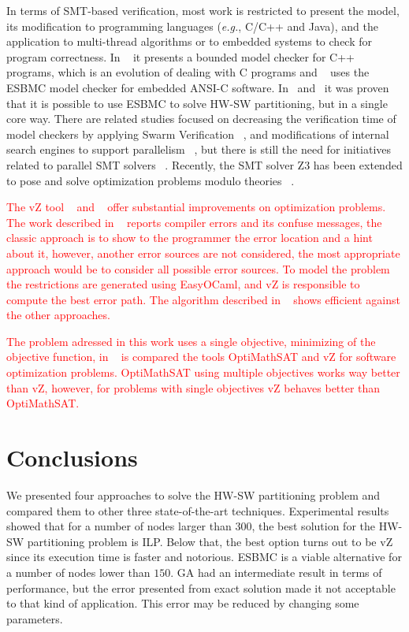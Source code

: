 In terms of SMT-based verification, most work is restricted to present the model, its modification to programming languages ({\it e.g.}, C/C++ and Java), and the application to multi-thread algorithms or to embedded systems to check for program correctness. In ~\cite{Ramalho2013} it presents a bounded model checker for C++ programs, which is an evolution of dealing with C programs and ~\cite{Cordeiro2012} uses the ESBMC model checker for embedded ANSI-C software. In~\cite{Trindade2015} and~\cite{Trindade2014} it was proven that it is possible to use ESBMC to solve HW-SW partitioning, but in a single core way. There are related studies focused on decreasing the verification time of model checkers by applying Swarm Verification ~\cite{Holzmann2011}, and modifications of internal search engines to support parallelism ~\cite{Holzmann2012}, but there is still the need for initiatives related to parallel SMT solvers ~\cite{Wintersteiger2009}. Recently, the SMT solver Z3 has been extended to pose and solve optimization problems modulo theories ~\cite{Bjorner2015}.

\textcolor{Red}{The vZ tool ~\cite{Bjorner2014} and ~\cite{Bjorner2015} offer substantial improvements on optimization problems. The work described in ~\cite{Pavlinovic2015} reports compiler errors and its confuse messages, the classic approach is to show to the programmer the error location and a hint about it, however, another error sources are not considered, the most appropriate approach would be to consider all possible error sources. To model the problem the restrictions are generated using EasyOCaml, and vZ is responsible to compute the best error path. The algorithm described in ~\cite{Pavlinovic2015} shows efficient against the other approaches.}

\textcolor{Red}{The problem adressed in this work uses a single objective, minimizing of the objective function, in ~\cite{Patrick2015} is compared the tools  OptiMathSAT and vZ for software optimization problems. OptiMathSAT using multiple objectives works way better than vZ, however, for problems with single objectives vZ behaves better than OptiMathSAT.}

\section{Conclusions}
\label{Conclusions}

We presented four approaches to solve the HW-SW partitioning problem and compared them to other three state-of-the-art techniques. Experimental results showed that for a number of nodes larger than $300$, the best solution for the HW-SW partitioning problem is ILP. Below that, the best option turns out to be vZ since its execution time is faster and notorious. ESBMC is a viable alternative for a number of nodes lower than $150$.  GA had an intermediate result in terms of performance, but the error presented from exact solution made it not acceptable to that kind of application. This error may be reduced by changing some parameters. 

